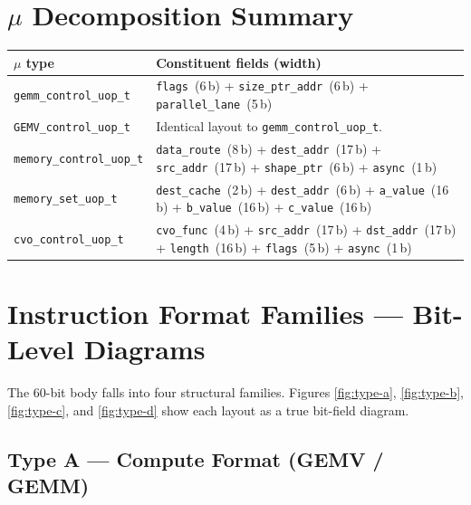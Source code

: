 \documentclass[11pt,a4paper,twoside,openany]{report}
\providecommand{\uop}{\ensuremath{\mu}\text{op}\xspace}
\begin{document}
\section{\uop Decomposition Summary}

\begin{longtable}{|l|p{10cm}|}
\hline
\rowcolor{skytint}
\textbf{\uop type} & \textbf{Constituent fields (width)} \\
\hline
\endfirsthead

\texttt{gemm\_control\_uop\_t}   & \texttt{flags}~(6\,b) + \texttt{size\_ptr\_addr}~(6\,b) + \texttt{parallel\_lane}~(5\,b) \\
\hline
\texttt{GEMV\_control\_uop\_t}   & Identical layout to \texttt{gemm\_control\_uop\_t}. \\
\hline
\texttt{memory\_control\_uop\_t} & \texttt{data\_route}~(8\,b) + \texttt{dest\_addr}~(17\,b) + \texttt{src\_addr}~(17\,b) + \texttt{shape\_ptr}~(6\,b) + \texttt{async}~(1\,b) \\
\hline
\texttt{memory\_set\_uop\_t}     & \texttt{dest\_cache}~(2\,b) + \texttt{dest\_addr}~(6\,b) + \texttt{a\_value}~(16\,b) + \texttt{b\_value}~(16\,b) + \texttt{c\_value}~(16\,b) \\
\hline
\texttt{cvo\_control\_uop\_t}    & \texttt{cvo\_func}~(4\,b) + \texttt{src\_addr}~(17\,b) + \texttt{dst\_addr}~(17\,b) + \texttt{length}~(16\,b) + \texttt{flags}~(5\,b) + \texttt{async}~(1\,b) \\
\hline
\end{longtable}

\section{Instruction Format Families — Bit-Level Diagrams}

The 60-bit body falls into four structural families. Figures
\ref{fig:type-a}, \ref{fig:type-b}, \ref{fig:type-c}, and
\ref{fig:type-d} show each layout as a true bit-field diagram.

\subsection{Type A --- Compute Format (GEMV / GEMM)}
\end{document}
